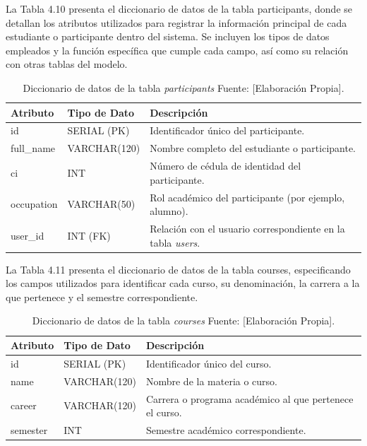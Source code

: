 La Tabla 4.10 presenta el diccionario de datos de la tabla participants, donde se detallan los atributos utilizados para registrar la información principal de cada estudiante o participante dentro del sistema. Se incluyen los tipos de datos empleados y la función específica que cumple cada campo, así como su relación con otras tablas del modelo.
\begin{table}[H]
\centering
\caption{Diccionario de datos de la tabla \textit{participants} Fuente: [Elaboración Propia].}
\begin{tabular}{|l|l|p{7.4cm}|}
\hline
\textbf{Atributo} & \textbf{Tipo de Dato} & \textbf{Descripción} \\ \hline
id & SERIAL (PK) & Identificador único del participante. \\ \hline
full\_name & VARCHAR(120) & Nombre completo del estudiante o participante. \\ \hline
ci & INT & Número de cédula de identidad del participante. \\ \hline
occupation & VARCHAR(50) & Rol académico del participante (por ejemplo, alumno). \\ \hline
user\_id & INT (FK) & Relación con el usuario correspondiente en la tabla \textit{users}. \\ \hline
\end{tabular}
\end{table}


La Tabla 4.11 presenta el diccionario de datos de la tabla courses, especificando los campos utilizados para identificar cada curso, su denominación, la carrera a la que pertenece y el semestre correspondiente.
\begin{table}[H]
\centering
\caption{Diccionario de datos de la tabla \textit{courses} Fuente: [Elaboración Propia].}
\begin{tabular}{|l|l|p{7.5cm}|}
\hline
\textbf{Atributo} & \textbf{Tipo de Dato} & \textbf{Descripción} \\ \hline
id & SERIAL (PK) & Identificador único del curso. \\ \hline
name & VARCHAR(120) & Nombre de la materia o curso. \\ \hline
career & VARCHAR(120) & Carrera o programa académico al que pertenece el curso. \\ \hline
semester & INT & Semestre académico correspondiente. \\ \hline
\end{tabular}
\end{table}




